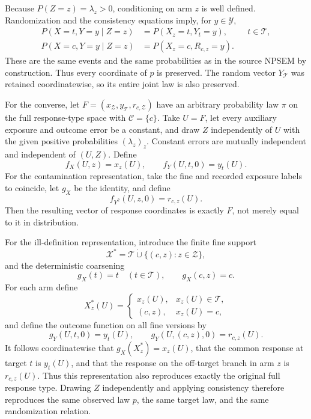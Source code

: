 Because \(P(Z=z)=\lambda_z>0\), conditioning on arm \(z\) is well defined.  Randomization and the consistency equations imply, for \(y\in\mathcal Y\),
\[
\begin{aligned}
P(X=t,Y=y\mid Z=z)
 &=P(X_z=t,Y_t=y), &&t\in\mathcal T,\\
P(X=c,Y=y\mid Z=z)
 &=P(X_z=c,R_{c,z}=y).
\end{aligned}
\]
These are the same events and the same probabilities as in the source NPSEM by construction.  Thus every coordinate of \(p\) is preserved.  The random vector \(Y_{\mathcal T}\) was retained coordinatewise, so its entire joint law is also preserved.

For the converse, let \(F=(x_{\mathcal Z},y_{\mathcal T},r_{c,\mathcal Z})\) have an arbitrary probability law \(\pi\) on the full response-type space with \(\mathcal C=\{c\}\).  Take \(U=F\), let every auxiliary exposure and outcome error be a constant, and draw \(Z\) independently of \(U\) with the given positive probabilities \((\lambda_z)_z\).  Constant errors are mutually independent and independent of \((U,Z)\).  Define
\[
f_X(U,z)=x_z(U),
\qquad
f_Y(U,t,0)=y_t(U).
\]
For the contamination representation, take the fine and recorded exposure labels to coincide, let \(g_X\) be the identity, and define
\[
f_{Y^2}(U,z,0)=r_{c,z}(U).
\]
Then the resulting vector of response coordinates is exactly \(F\), not merely equal to it in distribution.

For the ill-definition representation, introduce the finite fine support
\[
\mathcal X^*=\mathcal T\mathbin{\dot\cup}
\{(c,z):z\in\mathcal Z\},
\]
and the deterministic coarsening
\[
g_X(t)=t\quad(t\in\mathcal T),
\qquad g_X(c,z)=c.
\]
For each arm define
\[
X_z^*(U)=
\begin{cases}
x_z(U),&x_z(U)\in\mathcal T,\\
(c,z),&x_z(U)=c,
\end{cases}
\]
and define the outcome function on all fine versions by
\[
g_Y(U,t,0)=y_t(U),
\qquad
g_Y(U,(c,z),0)=r_{c,z}(U).
\]
It follows coordinatewise that \(g_X(X_z^*)=x_z(U)\), that the common response at target \(t\) is \(y_t(U)\), and that the response on the off-target branch in arm \(z\) is \(r_{c,z}(U)\).  Thus this representation also reproduces exactly the original full response type.  Drawing \(Z\) independently and applying consistency therefore reproduces the same observed law \(p\), the same target law, and the same randomization relation.

